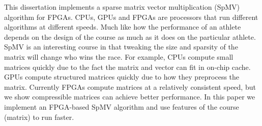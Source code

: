 This dissertation implements a sparse matrix vector multiplication (SpMV) algorithm for FPGAs. CPUs, GPUs and FPGAs are processors that run different algorithms at different speeds. Much like how the performance of an athlete depends on the design of the course as much as it does on the particular athlete. SpMV is an interesting course in that tweaking the size and sparsity of the matrix will change who wins the race. For example, CPUs compute small matrices quickly due to the fact the matrix and vector can fit in on-chip cache. GPUs compute structured matrices quickly due to how they preprocess the matrix. Currently FPGAs compute matrices at a relatively consistent speed, but we show compressible matrices can achieve better performance. In this paper we implement an FPGA-based SpMV algorithm and use features of the course (matrix) to run faster.
